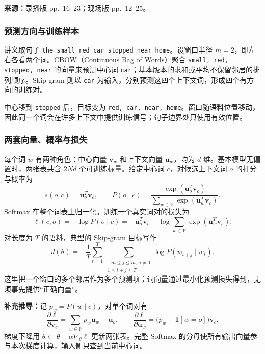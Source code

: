 
\nopagebreak[4]

\textbf{来源：}录播版 pp.~16--23；现场版 pp.~12--25。
\nopagebreak[4]

\subsubsection{预测方向与训练样本}

讲义取句子 \texttt{the small red car stopped near home}。设窗口半径 $m=2$，即左右各看两个词。CBOW（Continuous Bag of Words）聚合 \texttt{small, red, stopped, near} 的向量来预测中心词 \texttt{car}；基本版本的求和或平均不保留邻居的排列顺序。Skip-gram 则以 \texttt{car} 为输入，分别预测这四个上下文词，形成四个有方向的训练对。

中心移到 \texttt{stopped} 后，目标变为 \texttt{red, car, near, home}。窗口随语料位置移动，因此同一个词会在许多上下文中提供训练信号；句子边界处只使用有效位置。

\subsubsection{两套向量、概率与损失}

每个词 $w$ 有两种角色：中心向量 $\mathbf v_w$ 和上下文向量 $\mathbf u_w$，均为 $d$ 维。基本模型无偏置时，两张表共含 $2Nd$ 个可训练标量。给定中心词 $c$，对候选上下文词 $o$ 的打分与概率为
\[
  s(o,c)=\mathbf u_o^T\mathbf v_c,
  \qquad
  P(o\mid c)=\frac{\exp(\mathbf u_o^T\mathbf v_c)}
  {\sum_{w\in\mathcal V}\exp(\mathbf u_w^T\mathbf v_c)}.
\]
Softmax 在整个词表上归一化。训练一个真实词对的损失为
\[
  \ell(c,o)=-\log P(o\mid c)
  =-\mathbf u_o^T\mathbf v_c+
    \log\sum_{w\in\mathcal V}\exp(\mathbf u_w^T\mathbf v_c).
\]
对长度为 $T$ 的语料，典型的 Skip-gram 目标写作
\[
  J(\theta)=-\frac1T\sum_{t=1}^{T}
  \sum_{\substack{-m\leq j\leq m,\ j\neq0\\1\leq t+j\leq T}}
  \log P(w_{t+j}\mid w_t).
\]
这里把一个窗口的多个邻居作为多个预测项；词向量通过最小化预测损失得到，无须事先提供“正确向量”。

\textbf{补充推导：}记 $p_w=P(w\mid c)$，对单个词对有
\[
  \frac{\partial\ell}{\partial\mathbf v_c}
  =\sum_{w\in\mathcal V}p_w\mathbf u_w-\mathbf u_o,
  \qquad
  \frac{\partial\ell}{\partial\mathbf u_w}
  =\bigl(p_w-\mathbf1[w=o]\bigr)\mathbf v_c.
\]
梯度下降用 $\theta\leftarrow\theta-\alpha\nabla_\theta\ell$ 更新两张表。完整 Softmax 的分母使所有输出向量参与本次梯度计算，输入侧只查到当前中心词。

